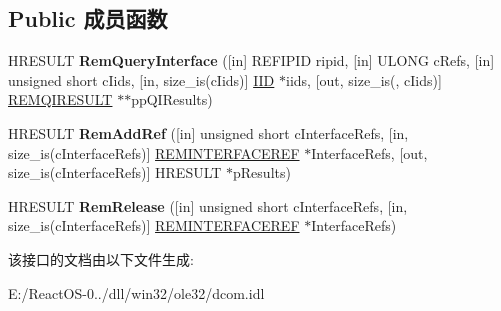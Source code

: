 \subsection*{Public 成员函数}
\begin{DoxyCompactItemize}
\item 
\mbox{\label{interface_i_rem_unknown_a465d78f108f5cdaffdc574e5304038ca}} 
H\+R\+E\+S\+U\+LT {\bfseries Rem\+Query\+Interface} (\mbox{[}in\mbox{]} R\+E\+F\+I\+P\+ID ripid, \mbox{[}in\mbox{]} U\+L\+O\+NG c\+Refs, \mbox{[}in\mbox{]} unsigned short c\+Iids, \mbox{[}in, size\+\_\+is(c\+Iids)\mbox{]} \hyperlink{struct___i_i_d}{I\+ID} $\ast$iids, \mbox{[}out, size\+\_\+is(, c\+Iids)\mbox{]} \hyperlink{struct_i_rem_unknown_1_1tag_r_e_m_q_i_r_e_s_u_l_t}{R\+E\+M\+Q\+I\+R\+E\+S\+U\+LT} $\ast$$\ast$pp\+Q\+I\+Results)
\item 
\mbox{\label{interface_i_rem_unknown_a21967b425f7a2849b69647cdd6f1ca1f}} 
H\+R\+E\+S\+U\+LT {\bfseries Rem\+Add\+Ref} (\mbox{[}in\mbox{]} unsigned short c\+Interface\+Refs, \mbox{[}in, size\+\_\+is(c\+Interface\+Refs)\mbox{]} \hyperlink{struct_i_rem_unknown_1_1tag_r_e_m_i_n_t_e_r_f_a_c_e_r_e_f}{R\+E\+M\+I\+N\+T\+E\+R\+F\+A\+C\+E\+R\+EF} $\ast$Interface\+Refs, \mbox{[}out, size\+\_\+is(c\+Interface\+Refs)\mbox{]} H\+R\+E\+S\+U\+LT $\ast$p\+Results)
\item 
\mbox{\label{interface_i_rem_unknown_ac18673a5ee511ccea7504b9195bd1c06}} 
H\+R\+E\+S\+U\+LT {\bfseries Rem\+Release} (\mbox{[}in\mbox{]} unsigned short c\+Interface\+Refs, \mbox{[}in, size\+\_\+is(c\+Interface\+Refs)\mbox{]} \hyperlink{struct_i_rem_unknown_1_1tag_r_e_m_i_n_t_e_r_f_a_c_e_r_e_f}{R\+E\+M\+I\+N\+T\+E\+R\+F\+A\+C\+E\+R\+EF} $\ast$Interface\+Refs)
\end{DoxyCompactItemize}


该接口的文档由以下文件生成\+:\begin{DoxyCompactItemize}
\item 
E\+:/\+React\+O\+S-\/0../dll/win32/ole32/dcom.\+idl\end{DoxyCompactItemize}
